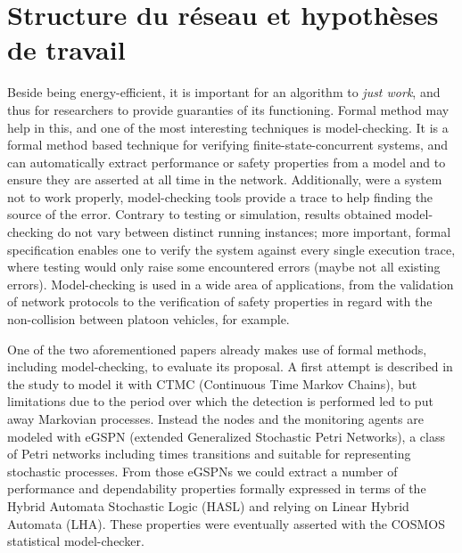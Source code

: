 \chapter{Structure du réseau et hypothèses de travail}\label{chap:st}

\renewcommand\chapterpath{Main/Structure}
\renewcommand\chapterfig{Main/Structure/Figures}





\bigskip
{}


Beside being energy-efficient, it is important for an algorithm to \emph{just work}, and thus for researchers to provide guaranties of its functioning.
Formal method may help in this, and one of the most interesting techniques is model-checking.
It is a formal method based technique for verifying finite-state-concurrent systems, and can automatically extract performance or safety properties from a model and to ensure they are asserted at all time in the network.
Additionally, were a system not to work properly, model-checking tools provide a trace to help finding the source of the error.
Contrary to testing or simulation, results obtained \via model-checking do not vary between distinct running instances; more important, formal specification enables one to verify the system against every single execution trace, where testing would only raise some encountered errors (maybe not all existing errors).
Model-checking is used in a wide area of applications, from the validation of network protocols to the verification of safety properties in regard with the non-collision between platoon vehicles\cite{E-ZCGGK12}, for example.

One of the two aforementioned papers already makes use of formal methods, including model-checking, to evaluate its proposal\cite{BMM13}.
A first attempt is described in the study to model it with CTMC (Continuous Time Markov Chains), but limitations due to the period over which the detection is performed led to put away Markovian processes.
Instead the nodes and the monitoring agents are modeled with eGSPN (extended Generalized Stochastic Petri Networks), a class of Petri networks including times transitions and suitable for representing stochastic processes.
From those eGSPNs we could extract a number of performance and dependability properties formally expressed in terms of the Hybrid Automata Stochastic Logic (HASL\cite{BDDHP11hasl}) and relying on Linear Hybrid Automata (LHA).
These properties were eventually asserted with the COSMOS statistical model-checker\cite{BDDHP11cosmos}.

